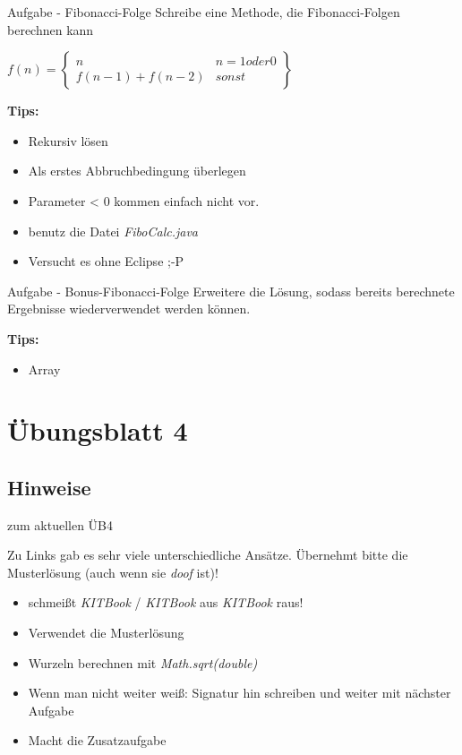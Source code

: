 \documentclass[18pt]{beamer}
\begin{document}


\begin{frame}{Aufgabe - Fibonacci-Folge}
	Schreibe eine Methode, die Fibonacci-Folgen berechnen kann
	
	$f(n) = \begin{Bmatrix}
		n & n = 1 oder 0 \\
		f(n - 1) + f(n - 2) & sonst
	\end{Bmatrix}$
	
	\textbf{Tips:}
	\begin{itemize}
		\item Rekursiv lösen
		\item Als erstes Abbruchbedingung überlegen
		\item Parameter < 0 kommen einfach nicht vor.
		\item benutz die Datei \emph{FiboCalc.java}
		\item Versucht es ohne Eclipse ;-P
	\end{itemize}
\end{frame}



\begin{frame}{Aufgabe - Bonus-Fibonacci-Folge}
	Erweitere die Lösung, sodass bereits berechnete Ergebnisse wiederverwendet werden können.
	
	\textbf{Tips:}
	\begin{itemize}
		\item Array
	\end{itemize}
\end{frame}


\section{Übungsblatt 4}
\subsection*{Hinweise}
\begin{frame}{zum aktuellen ÜB4}

	Zu Links gab es sehr viele unterschiedliche Ansätze. Übernehmt bitte die Musterlösung (auch wenn sie \emph{doof} ist)!
	
	\begin{itemize}
		\item schmeißt \emph{KITBook} / \emph{KITBook} aus \emph{KITBook} raus!
		\item Verwendet die Musterlösung
		\item Wurzeln berechnen mit \emph{Math.sqrt(double)}
		\item Wenn man nicht weiter weiß: Signatur hin schreiben und weiter mit nächster Aufgabe
		\item Macht die Zusatzaufgabe
	\end{itemize}
\end{frame}
\end{document}

